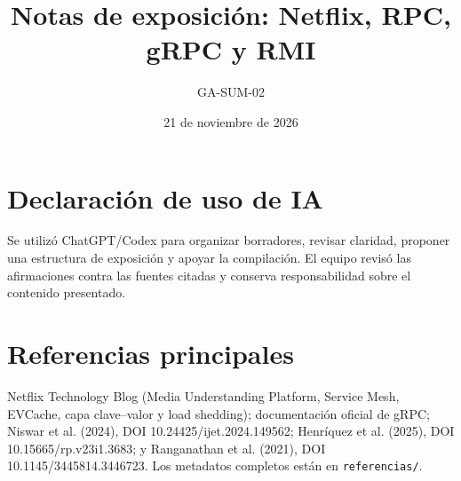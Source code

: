 \documentclass[9pt,twocolumn]{extarticle}
\title{Notas de exposición: Netflix, RPC, gRPC y RMI}
\author{GA-SUM-02}
\date{21 de noviembre de 2026}
\begin{document}
\maketitle




\section*{Declaración de uso de IA}
Se utilizó ChatGPT/Codex para organizar borradores, revisar claridad, proponer
una estructura de exposición y apoyar la compilación. El equipo revisó las
afirmaciones contra las fuentes citadas y conserva responsabilidad sobre el
contenido presentado.
\section*{Referencias principales}
Netflix Technology Blog (Media Understanding Platform, Service Mesh, EVCache,
capa clave--valor y load shedding); documentación oficial de gRPC; Niswar et
al. (2024), DOI 10.24425/ijet.2024.149562; Henríquez et al. (2025), DOI
10.15665/rp.v23i1.3683; y Ranganathan et al. (2021), DOI
10.1145/3445814.3446723. Los metadatos completos están en
\texttt{referencias/}.
\end{document}
